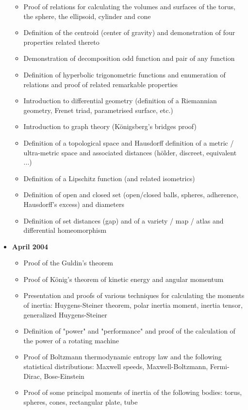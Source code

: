 \documentclass[12pt,a4paper,twoside,openright]{report}
\newcounter{def}
\theoremstyle{definition}
\theoremstyle{itexmp}
\numberwithin{equation}{section}
\begin{document}
\begin{itemize}
\begin{itemize}[noitemsep]
			\item Proof of relations for calculating the volumes and surfaces of the torus, the sphere, the ellipsoid, cylinder and cone
			\item Definition of the centroid (center of gravity) and demonstration of four properties related thereto
			\item Demonstration of decomposition odd function and pair of any function
			\item Definition of hyperbolic trigonometric functions and enumeration of relations and proof of related remarkable properties
			\item Introduction to differential geometry (definition of a Riemannian geometry, Frenet triad, parametrised surface, etc.)
			\item Introduction to graph theory (Königsberg's bridges proof)
			\item Definition of a topological space and Hausdorff definition of a metric / ultra-metric space and associated distances (hölder, discreet, equivalent ...)
			\item Definition of a Lipschitz function (and related isometrics)
			\item Definition of open and closed set (open/closed balls, spheres, adherence, Hausdorff's excess) and diameters
			\item Definition of set distances (gap) and of a variety / map / atlas and differential homeomorphism
		\end{itemize}
	\item \textbf{April 2004}
		\begin{itemize}[noitemsep]
			\item Proof of the Guldin's theorem
			\item Proof of König's theorem of kinetic energy and angular momentum
			\item Presentation and proofs of various techniques for calculating the moments of inertia: Huygens-Steiner theorem, polar inertia moment, inertia tensor, generalized Huygens-Steiner
			\item Definition of "power" and "performance" and proof of the calculation of the power of a rotating machine
			\item Proof of Boltzmann thermodynamic entropy law and the following statistical distributions: Maxwell speeds, Maxwell-Boltzmann, Fermi-Dirac, Bose-Einstein
			\item Proof of some principal moments of inertia of the following bodies: torus, spheres, cones, rectangular plate, tube

\end{itemize}
\end{itemize}
\end{document}
